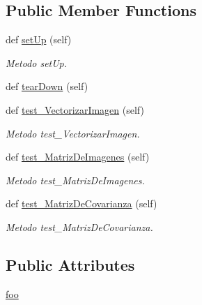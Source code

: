 \subsection*{Public Member Functions}
\begin{DoxyCompactItemize}
\item 
def \hyperlink{class_controller_1_1_controlador_prueba_unitaria_1_1_controlador_test_a2e8184870a51acab5ddda57d6ae0a6af}{set\+Up} (self)
\begin{DoxyCompactList}\small\item\em Metodo set\+Up. \end{DoxyCompactList}\item 
def \hyperlink{class_controller_1_1_controlador_prueba_unitaria_1_1_controlador_test_a0aa297aa7af4503138e4e84d3fcd40d2}{tear\+Down} (self)
\item 
def \hyperlink{class_controller_1_1_controlador_prueba_unitaria_1_1_controlador_test_ab91d55bbbbfb2b11399063e00460fed6}{test\+\_\+\+Vectorizar\+Imagen} (self)
\begin{DoxyCompactList}\small\item\em Metodo test\+\_\+\+Vectorizar\+Imagen. \end{DoxyCompactList}\item 
def \hyperlink{class_controller_1_1_controlador_prueba_unitaria_1_1_controlador_test_a149c2fe8732cf438622aefdfad75dd4a}{test\+\_\+\+Matriz\+De\+Imagenes} (self)
\begin{DoxyCompactList}\small\item\em Metodo test\+\_\+\+Matriz\+De\+Imagenes. \end{DoxyCompactList}\item 
def \hyperlink{class_controller_1_1_controlador_prueba_unitaria_1_1_controlador_test_a7bdd98073dfdcbe13627c7bee7d64f55}{test\+\_\+\+Matriz\+De\+Covarianza} (self)
\begin{DoxyCompactList}\small\item\em Metodo test\+\_\+\+Matriz\+De\+Covarianza. \end{DoxyCompactList}\end{DoxyCompactItemize}
\subsection*{Public Attributes}
\begin{DoxyCompactItemize}
\item 
\hyperlink{class_controller_1_1_controlador_prueba_unitaria_1_1_controlador_test_a2f176dc83cda878c82e90b5eed2c321a}{foo}
\end{DoxyCompactItemize}


